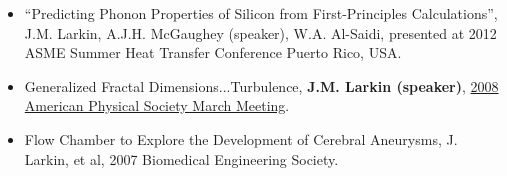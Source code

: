\documentclass{article}
\newcommand{\lineunder}{\vspace*{-8pt} \\ \hspace*{-18pt} \hrulefill \\}
\newcommand{\header}[1]{{\hspace*{-15pt}\vspace*{6pt} \textsc{#1}} \vspace*{-6pt} \lineunder}
\newenvironment{achievements}{\begin{list}{$\bullet$}{\topsep 0pt \itemsep -2pt}}{\vspace*{4pt}\end{list}}
\begin{document}
\begin{itemize}[leftmargin=*]
\item “Predicting Phonon Properties of Silicon from First-Principles Calculations”, J.M. Larkin, A.J.H. McGaughey (speaker), W.A. Al-Saidi, presented at 2012 ASME Summer Heat Transfer Conference Puerto Rico, USA.
\item Generalized Fractal Dimensions...Turbulence, \textbf{J.M. Larkin (speaker)}, \href{http://meetings.aps.org/Meeting/MAR08/Content/1017}{2008 American Physical Society March Meeting}.
\item Flow Chamber to Explore the Development of Cerebral Aneurysms, J. Larkin, et al, 2007 Biomedical Engineering Society. 
\end{itemize}



\end{document}

